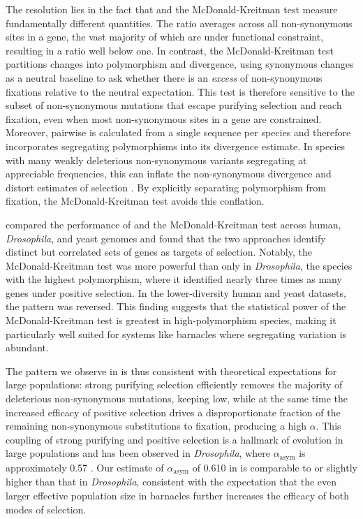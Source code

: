 The resolution lies in the fact that \dnds{} and the McDonald-Kreitman test measure
fundamentally different quantities. The \dnds{} ratio averages across all
non-synonymous sites in a gene, the vast majority of which are under functional
constraint, resulting in a ratio well below one. In contrast, the McDonald-Kreitman
test partitions changes into polymorphism and divergence, using synonymous changes
as a neutral baseline to ask whether there is an \textit{excess} of non-synonymous
fixations relative to the neutral expectation. This test is therefore sensitive to
the subset of non-synonymous mutations that escape purifying selection and reach
fixation, even when most non-synonymous sites in a gene are constrained.
Moreover, pairwise \dnds{} is calculated from a single sequence per species and
therefore incorporates segregating polymorphisms into its divergence estimate. In
species with many weakly deleterious non-synonymous variants segregating at
appreciable frequencies, this can inflate the non-synonymous divergence and distort
estimates of selection \citep{li_reverse_2008}. By explicitly separating
polymorphism from fixation, the McDonald-Kreitman test avoids this conflation.
\vspace{0.1cm}

\citet{li_reverse_2008} compared the performance of \dnds{} and the McDonald-Kreitman
test across human, \textit{Drosophila}, and yeast genomes and found that the two
approaches identify distinct but correlated sets of genes as targets of selection.
Notably, the McDonald-Kreitman test was more powerful than \dnds{} only in
\textit{Drosophila}, the species with the highest polymorphism, where it
identified nearly three times as many genes under positive selection. In the
lower-diversity human and yeast datasets, the pattern was reversed. This finding
suggests that the statistical power of the McDonald-Kreitman test is greatest in
high-polymorphism species, making it particularly well suited for systems like
barnacles where segregating variation is abundant.
\vspace{0.1cm}

The pattern we observe in \bgla{} is thus consistent with theoretical expectations
for large populations: strong purifying selection efficiently removes the majority
of deleterious non-synonymous mutations, keeping \dnds{} low, while at the same time
the increased efficacy of positive selection drives a disproportionate fraction of
the remaining non-synonymous substitutions to fixation, producing a high
$\alpha$. This coupling of strong purifying and positive selection is a hallmark
of evolution in large populations and has been observed in \textit{Drosophila}, where
$\alpha_\text{asym}$ is approximately 0.57 \citep{messer_frequent_2013}.
Our estimate of $\alpha_\text{asym}$ of 0.610 in \bgla{} is comparable to
or slightly higher than that in \textit{Drosophila}, consistent with the expectation
that the even larger effective population size in barnacles further increases the
efficacy of both modes of selection.
\vspace{0.1cm}


